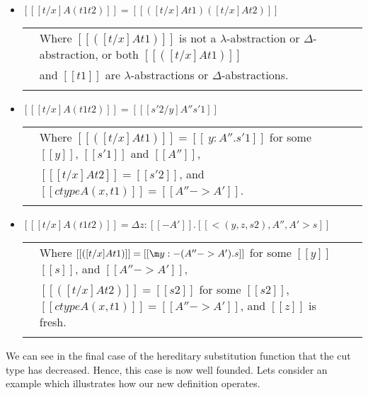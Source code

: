 \begin{definition}
\begin{itemize}
  \item[] $[[ [t/x] A (t1 t2)]] = [[([t/x] A t1) ([t/x] A t2)]]$\\
    \begin{tabular}{lll}
      & Where $[[([t/x] A t1)]]$ is not a $\lambda$-abstraction or $\Delta$-abstraction,  or both $[[([t/x] A t1)]]$ \\
      & and  $[[t1]]$ are $\lambda$-abstractions or $\Delta$-abstractions.\\
      & \\
    \end{tabular}

  \item[] $[[ [t/x] A (t1 t2)]] = [[ [s'2/y] A'' s'1]]$\\
    \begin{tabular}{lll}
      & Where $[[([t/x] A t1)]] = [[\ y:A''.s'1]]$ for some $[[y]]$, $[[s'1]]$ and $[[A'']]$, \\
      & $[[ [t/x] A t2]] = [[s'2]]$, and $[[ctype A (x,t1)]] = [[A'' -> A']]$. \\
      & \\
    \end{tabular}

  \item[] $[[ [t/x] A (t1 t2)]] = \Delta z:[[{-A'}]].[[<(y,z,s2),A'',A'>s]]$\\
    \begin{tabular}{lll}
      & Where $[[([t/x] A t1)]] = [[\m y:{-(A''->A')}.s]]$ for some $[[y]]$ $[[s]]$, 
      and $[[A'' -> A']]$, \\      
      & $[[([t/x] A t2)]] = [[s2]]$ for some $[[s2]]$, $[[ctype A (x,t1)]] = [[A'' -> A']]$, and $[[z]]$ is fresh.\\
      & \\
    \end{tabular}  
  \end{itemize}
\end{definition}
We can see in the final case of the hereditary substitution function that the cut type has decreased.  Hence, this
case is now well founded. Lets consider an example which illustrates how our new definition operates. 
